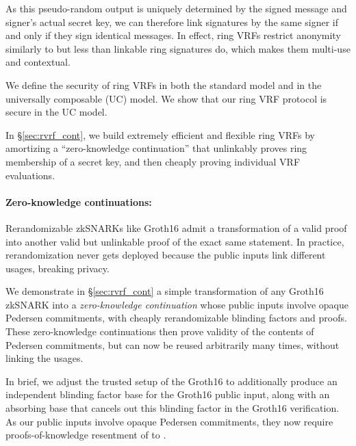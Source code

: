 As this pseudo-random output is uniquely determined by the signed message
and signer's actual secret key, we can therefore link signatures by the
same signer if and only if they sign identical messages.
In effect, ring VRFs restrict anonymity similarly to but less than
linkable ring signatures do, which makes them multi-use and contextual.

We define the security of ring VRFs in both the standard model
and in the universally composable (UC) \cite{canetti1,canetti2} model. 
We show that our ring VRF protocol is secure in the UC model.

In \S\ref{sec:rvrf_cont}, we build extremely efficient and flexible
ring VRFs by amortizing a ``zero-knowledge continuation'' that unlinkably
proves ring membership of a secret key, and then cheaply proving
individual VRF evaluations.


\paragraph{Zero-knowledge continuations:}

Rerandomizable zkSNARKs like Groth16 \cite{Groth16} admit a
transformation of a valid proof into another valid but unlinkable
proof of the exact same statement.  In practice, rerandomization
never gets deployed because the public inputs link different usages,
breaking privacy.

We demonstrate in \S\ref{sec:rvrf_cont} a simple transformation of
any Groth16 zkSNARK into a {\it zero-knowledge continuation} whose
public inputs involve opaque Pedersen commitments, with cheaply
rerandomizable blinding factors and proofs.
These zero-knowledge continuations then prove validity of the contents
of Pedersen commitments, but can now be reused arbitrarily many times,
without linking the usages.

In brief, we adjust the trusted setup of the Groth16 to additionally
produce an independent blinding factor base for the Groth16 public input, 
along with an absorbing base that cancels out this blinding factor in the
Groth16 verification.
As our public inputs involve opaque Pedersen commitments,
they now require proofs-of-knowledge resentment of to \cite{LegoSNARK}. 

